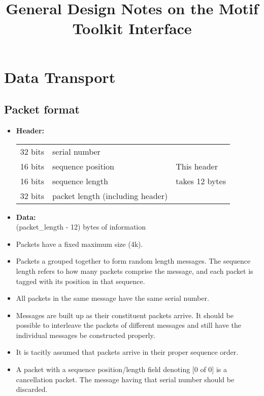 \documentclass{article}
\title{General Design Notes on the Motif Toolkit Interface}
\begin{document}
\maketitle

\section{Data Transport}

\subsection{Packet format}

\begin{itemize}
\item	\textbf{Header:}\\[2mm]
	\begin{center}
\begin{tabular}{|l|l|l|}
	\hline
	32 bits & serial number & \\\cline{1-2}
	16 bits & sequence position &  This header\\\cline{1-2}
	16 bits & sequence length   &  takes 12 bytes\\\cline{1-2}
	32 bits & packet length (including header) & \\\hline
	\end{tabular}
\end{center}
\item	\textbf{Data:}\\[2mm]
	(packet\_length - 12) bytes of information
\end{itemize}

\begin{itemize}
\item	Packets have a fixed maximum size (4k).

\item	Packets a grouped together to form random length messages.  The
	sequence length refers to how many packets comprise the
	message, and each packet is tagged with its position in that sequence.

\item	All packets in the same message have the same serial number.
\item	Messages are built up as their constituent packets arrive.  It should
	be possible to interleave the packets of different messages
	and still have the individual messages be constructed
	properly.
\item	It is tacitly assumed that packets arrive in their proper
	sequence order. 
\item	A packet with a sequence position/length field denoting [0 of 0] is a
	cancellation packet.  The message having that serial number should be
	discarded.
\end{itemize}
\end{document}
